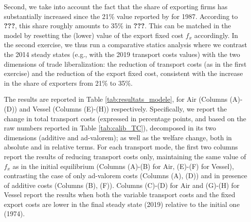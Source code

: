 \documentclass[a4paper,11pt]{article}
\begin{document}
Second, we take into account the fact that the share of exporting firms has substantially increased since the 21\% value reported by \citet{Lincoln_McCallum2018} for 1987. According to \textbf{???}, this share roughly amounts to 35\% in \textbf{???}. This can be matched in the model by resetting the (lower) value of the export fixed cost $f_x$ accordingly. In the second exercise, we thus run a comparative statics analysis where we contrast the 2014 steady states (e.g., with the 2019 transport costs values) with the two dimensions of trade liberalization: the reduction of transport costs (as in the first exercise) and the reduction of the export fixed cost, consistent with the increase in the share of exporters from 21\% to 35\%.

The results are reported in Table \ref{tab:resultats_modele}, for Air (Columns (A)-(D)) and Vessel (Columns (E)-(H)) respectively. Specifically, we report the change in total transport costs (expressed in percentage points, and based on the raw numbers reported in Table \ref{tab:calib_TC}), decomposed in its two dimensions (additive and ad-valorem); as well as the welfare change, both in absolute and in relative terms.
For each transport mode, the first two columns report the results of reducing transport costs only, maintaining the same value of $f_x$ as in the initial equilibrium (Columns (A)-(B) for Air, (E)-(F) for Vessel), contrasting the case of only ad-valorem costs (Columns (A), (D)) and in presence of additive costs (Columns (B), (F)). Columns (C)-(D) for Air and (G)-(H) for Vessel report the results when both the variable transport costs and the fixed export costs are lower in the final steady state (2019) relative to the initial one (1974).
\end{document}
